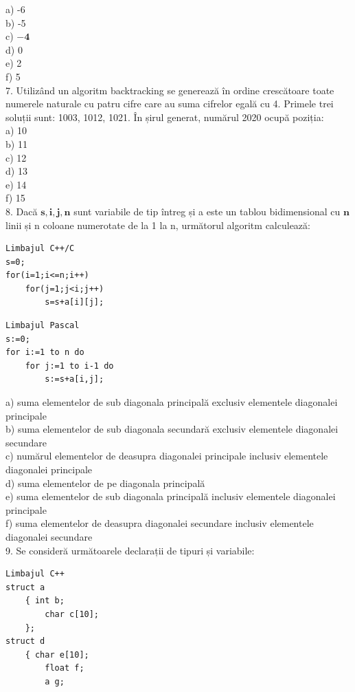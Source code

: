 \documentclass[10pt]{article}
\begin{document}
a) -6\\
b) -5\\
c) $\mathbf{- 4}$\\
d) 0\\
e) 2\\
f) 5\\
7. Utilizând un algoritm backtracking se generează în ordine crescătoare toate numerele naturale cu patru cifre care au suma cifrelor egală cu 4. Primele trei soluții sunt: 1003, 1012, 1021. În șirul generat, numărul 2020 ocupă poziția:\\
a) 10\\
b) 11\\
c) 12\\
d) 13\\
e) 14\\
f) 15\\
8. Dacă $\mathbf{s}, \mathbf{i}, \mathbf{j}, \mathbf{n}$ sunt variabile de tip întreg și a este un tablou bidimensional cu $\mathbf{n}$ linii și n coloane numerotate de la 1 la n, următorul algoritm calculează:

\begin{verbatim}
Limbajul C++/C
s=0;
for(i=1;i<=n;i++)
    for(j=1;j<i;j++)
        s=s+a[i][j];
\end{verbatim}

\begin{verbatim}
Limbajul Pascal
s:=0;
for i:=1 to n do
    for j:=1 to i-1 do
        s:=s+a[i,j];
\end{verbatim}

a) suma elementelor de sub diagonala principală exclusiv elementele diagonalei principale\\
b) suma elementelor de sub diagonala secundară exclusiv elementele diagonalei secundare\\
c) numărul elementelor de deasupra diagonalei principale inclusiv elementele diagonalei principale\\
d) suma elementelor de pe diagonala principală\\
e) suma elementelor de sub diagonala principală inclusiv elementele diagonalei principale\\
f) suma elementelor de deasupra diagonalei secundare inclusiv elementele diagonalei secundare\\
9. Se consideră următoarele declarații de tipuri și variabile:

\begin{verbatim}
Limbajul C++
struct a
    { int b;
        char c[10];
    };
struct d
    { char e[10];
        float f;
        a g;
\end{verbatim}
\end{document}
